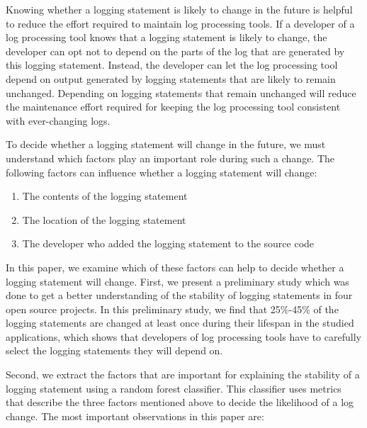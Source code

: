 Knowing whether a logging statement is likely to change in the future is helpful to reduce the effort required to maintain log processing tools. If a developer of a log processing tool knows that a logging statement is likely to change, the developer can opt not to depend on the parts of the log that are generated by this logging statement. Instead, the developer can let the log processing tool depend on output generated by logging statements that are likely to remain unchanged. Depending on logging statements that remain unchanged will reduce the maintenance effort required for keeping the log processing tool consistent with ever-changing logs. 


To decide whether a logging statement will change in the future, we must understand which factors play an important role during such a change. The following factors can influence whether a logging statement will change:
\begin{enumerate}
\item The contents of the logging statement
\item The location of the logging statement
\item The developer who added the logging statement to the source code
\end{enumerate}
In this paper, we examine which of these factors can help to decide whether a logging statement will change. First, we present a preliminary study which was done to get a better understanding of the stability of logging statements in four open source projects. In this preliminary study, we find that 25\%-45\% of the logging statements are changed at least once during their lifespan in the studied applications, which shows that developers of log processing tools have to carefully select the logging statements they will depend on. 

Second, we extract the factors that are important for explaining the stability of a logging statement using a random forest classifier. This classifier uses metrics that describe the three factors mentioned above to decide the likelihood of a log change.
The most important observations in this paper are:



